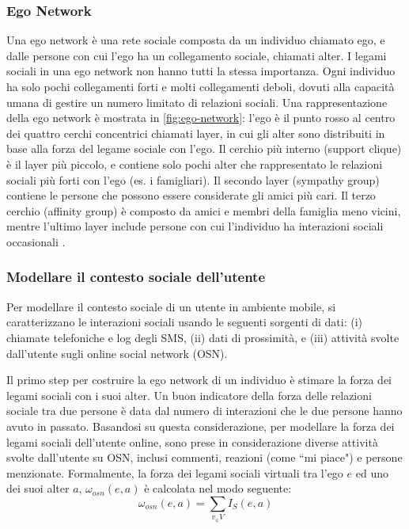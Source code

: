 \documentclass[12pt,italian]{report}
\begin{document}
\subsubsection{Ego Network}
Una ego network è una rete sociale composta da un individuo chiamato ego, e dalle persone con cui l'ego ha un collegamento sociale, chiamati alter. I legami sociali in una ego network non hanno tutti la stessa importanza. Ogni individuo ha solo pochi collegamenti forti e molti collegamenti deboli, dovuti alla capacità umana di gestire un numero limitato di relazioni sociali. Una rappresentazione della ego network è mostrata in \autoref{fig:ego-network}: l'ego è il punto rosso al centro dei quattro cerchi concentrici chiamati layer, in cui gli alter sono distribuiti in base alla forza del legame sociale con l'ego. Il cerchio più interno (support clique) è il layer più piccolo, e contiene solo pochi alter che rappresentato le relazioni sociali più forti con l'ego (es. i famigliari). Il secondo layer (sympathy group) contiene le persone che possono essere considerate gli amici più cari. Il terzo cerchio (affinity group) è composto da amici e membri della famiglia meno vicini, mentre l'ultimo layer include persone con cui l'individuo ha interazioni sociali occasionali \cite{ego-net}.

\subsubsection{Modellare il contesto sociale dell'utente}
Per modellare il contesto sociale di un utente in ambiente mobile, si caratterizzano le interazioni sociali usando le seguenti sorgenti di dati: (i) chiamate telefoniche e log degli SMS, (ii) dati di prossimità, e (iii) attività svolte dall'utente sugli online social network (OSN).

Il primo step per costruire la ego network di un individuo è stimare la forza dei legami sociali con i suoi alter. Un buon indicatore della forza delle relazioni sociale tra due persone è data dal numero di interazioni che le due persone hanno avuto in passato. Basandosi su questa considerazione, per modellare la forza dei legami sociali dell'utente online, sono prese in considerazione diverse attività svolte dall'utente su OSN, inclusi commenti, reazioni (come ``mi piace") e persone menzionate. Formalmente, la forza dei legami sociali virtuali tra l'ego $e$ ed uno dei suoi alter $a$, $\omega_{osn}(e,a)$ è calcolata nel modo seguente:
\begin{equation}	
	\omega_{osn}(e,a)=\sum_{v_\in V}I_S (e, a)
\end{equation}
\end{document}
